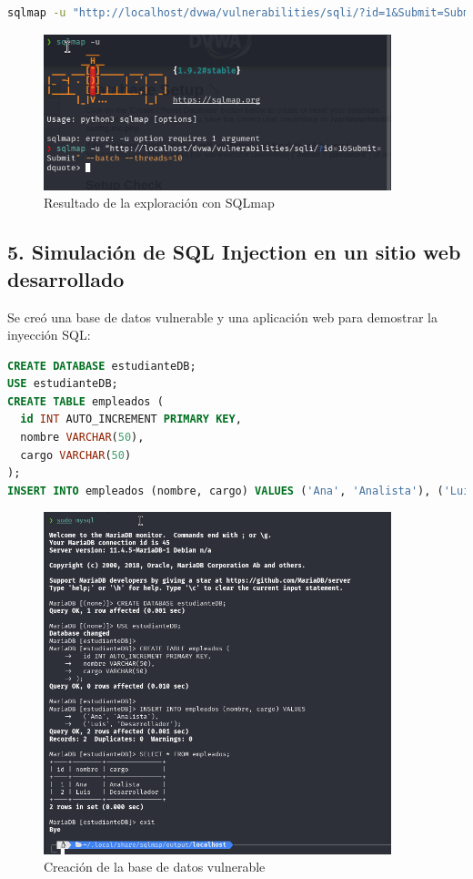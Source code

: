 \documentclass[12pt,a4paper]{article}
\begin{document}
\begin{lstlisting}[language=bash, caption=Obtención de bases de datos]
sqlmap -u "http://localhost/dvwa/vulnerabilities/sqli/?id=1&Submit=Submit" --dbs
\end{lstlisting}

\begin{figure}[H]
    \centering
    \includegraphics[width=0.9\textwidth]{sqlmap_u.png}
    \caption{Resultado de la exploración con SQLmap}
    \label{fig:sqlmap_u}
\end{figure}

\subsection{5. Simulación de SQL Injection en un sitio web desarrollado}
Se creó una base de datos vulnerable y una aplicación web para demostrar la inyección SQL:

\begin{lstlisting}[language=sql, caption=Creación de base de datos vulnerable]
CREATE DATABASE estudianteDB;
USE estudianteDB;
CREATE TABLE empleados (
  id INT AUTO_INCREMENT PRIMARY KEY,
  nombre VARCHAR(50),
  cargo VARCHAR(50)
);
INSERT INTO empleados (nombre, cargo) VALUES ('Ana', 'Analista'), ('Luis', 'Desarrollador');
\end{lstlisting}

\begin{figure}[H]
    \centering
    \includegraphics[width=0.9\textwidth]{create_database.png}
    \caption{Creación de la base de datos vulnerable}
    \label{fig:create_db}
\end{figure}
\end{document}
